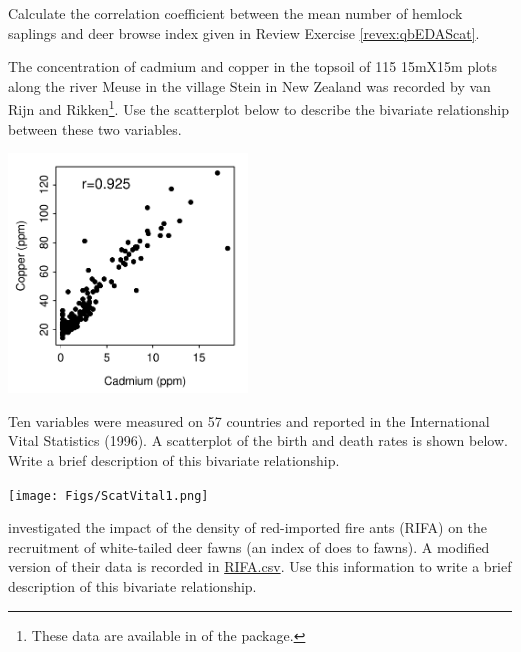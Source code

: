 \documentclass[10pt,openany]{book}\usepackage[]{graphicx}\usepackage[]{color}
\begin{document}
\begin{exsection}
  \item \label{revex:qbEDAcorr} \rhw{} Calculate the correlation coefficient between the mean number of hemlock saplings and deer browse index given in Review Exercise \ref{revex:qbEDAScat}. 

  \item \label{revex:qbEDASoil} The concentration of cadmium and copper in the topsoil of 115 15mX15m plots along the river Meuse in the village Stein in New Zealand was recorded by van Rijn and Rikken\footnote{These data are available in  of the  package.}.  Use the scatterplot below to describe the bivariate relationship between these two variables. 

  \begin{center}
    \includegraphics[width=2.5in]{Figs/ScatSoil-1}
  \end{center}

  \item \label{revex:qbEDAVital} Ten variables were measured on 57 countries and reported in the International Vital Statistics (1996).  A scatterplot of the birth and death rates is shown below.  Write a brief description of this bivariate relationship.  
  \begin{center}
    \texttt{[image: Figs/ScatVital1.png]}
  \end{center}

  \item \label{revex:qbEDAAllen} \rhw{} \cite{Allenetal1997} investigated the impact of the density of red-imported fire ants (RIFA) on the recruitment of white-tailed deer fawns (an index of does to fawns).  A modified version of their data is recorded in \href{https://raw.githubusercontent.com/droglenc/NCData/master/RIFA.csv}{RIFA.csv}.  Use this information to write a brief description of this bivariate relationship. 


\end{exsection}
\end{document}
